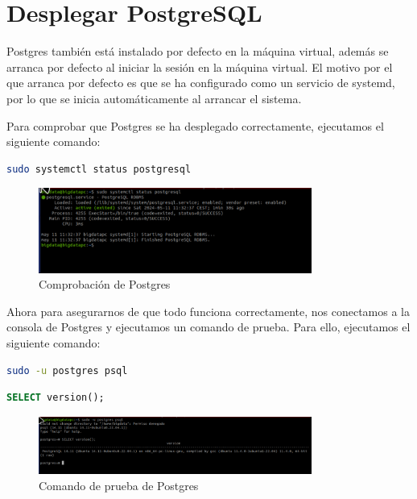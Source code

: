 \section{Desplegar PostgreSQL}

Postgres también está instalado por defecto en la máquina virtual, además se arranca por defecto al iniciar la sesión en la máquina virtual. El motivo por el que arranca por defecto es que se ha configurado como un servicio de systemd, por lo que se inicia automáticamente al arrancar el sistema.

Para comprobar que Postgres se ha desplegado correctamente, ejecutamos el siguiente comando:

\begin{lstlisting}[language=bash]
    sudo systemctl status postgresql
\end{lstlisting}

\begin{figure}[H]
    \centering
    \includegraphics[width=0.8\textwidth]{figures/9.png}
    \caption{Comprobación de Postgres}
\end{figure}

Ahora para asegurarnos de que todo funciona correctamente, nos conectamos a la consola de Postgres y ejecutamos un comando de prueba. Para ello, ejecutamos el siguiente comando:

\begin{lstlisting}[language=bash]
    sudo -u postgres psql
\end{lstlisting}

\begin{lstlisting}[language=sql]
    SELECT version();
\end{lstlisting}

\begin{figure}[H]
    \centering
    \includegraphics[width=0.8\textwidth]{figures/10.png}
    \caption{Comando de prueba de Postgres}
\end{figure}


